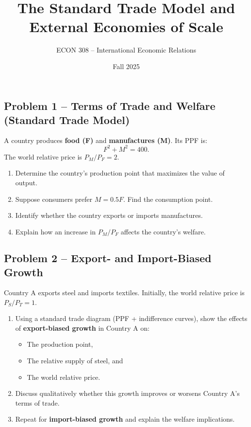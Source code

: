 \documentclass[12pt]{article}
\title{The Standard Trade Model and External Economies of Scale}
\author{ECON 308 -- International Economic Relations}
\date{Fall 2025}
\begin{document}
\maketitle




\subsection*{Problem 1 – Terms of Trade and Welfare (Standard Trade Model)}

A country produces \textbf{food (F)} and \textbf{manufactures (M)}.  
Its PPF is:
\[
F^2 + M^2 = 400.
\]
The world relative price is \( P_M / P_F = 2. \)

\begin{enumerate}[label=(\alph*)]
\item Determine the country’s production point that maximizes the value of output.  
\item Suppose consumers prefer \( M = 0.5F \). Find the consumption point.  
\item Identify whether the country exports or imports manufactures.  
\item Explain how an increase in \( P_M / P_F \) affects the country’s welfare.  
\end{enumerate}

\vspace{1em}

\subsection*{Problem 2 – Export- and Import-Biased Growth}

Country A exports steel and imports textiles.  
Initially, the world relative price is \( P_S / P_T = 1. \)

\begin{enumerate}[label=(\alph*)]
\item Using a standard trade diagram (PPF + indifference curves), show the effects of \textbf{export-biased growth} in Country A on:
\begin{itemize}
    \item The production point,  
    \item The relative supply of steel, and  
    \item The world relative price.
\end{itemize}
\item Discuss qualitatively whether this growth improves or worsens Country A’s terms of trade.  
\item Repeat for \textbf{import-biased growth} and explain the welfare implications.  
\end{enumerate}
\end{document}
